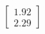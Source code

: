 \documentclass[preview]{standalone}
\begin{document}
\begin{align*}
\begin{bmatrix} 1.92 \\ 2.29 \end{bmatrix}
\end{align*}
\end{document}
